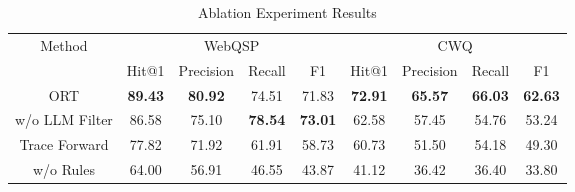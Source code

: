 \begin{table*}[t]
\centering
\caption{Ablation Experiment Results}
\label{tabel:ablation}
\begin{tabular}{c c c c c | c c c c }
\toprule
\multirow{2}{*}{Method} & \multicolumn{4}{c|}{WebQSP} & \multicolumn{4}{c}{CWQ} \\
\cmidrule(lr){2-5} \cmidrule(lr){6-9}
 & Hit@1 & Precision & Recall & F1 & Hit@1 & Precision & Recall & F1 \\
\midrule
ORT & \textbf{89.43} & \textbf{80.92} & 74.51 & 71.83 & \textbf{72.91} & \textbf{65.57} & \textbf{66.03} & \textbf{62.63} \\
w/o LLM Filter & 86.58 & 75.10 & \textbf{78.54} & \textbf{73.01} & 62.58 & 57.45 & 54.76 & 53.24 \\
Trace Forward & 77.82 & 71.92 & 61.91 & 58.73 & 60.73 & 51.50 & 54.18 & 49.30 \\
w/o Rules & 64.00 & 56.91 & 46.55 & 43.87 & 41.12 & 36.42 & 36.40 & 33.80 \\
\bottomrule
\end{tabular}
\end{table*}